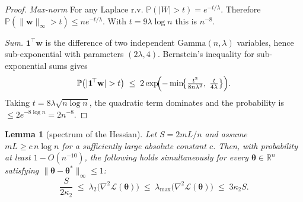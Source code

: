 \documentclass[letterpaper,12pt]{article}
\numberwithin{equation}{section}
\theoremstyle{plain}
\numberwithin{Theorem}{section}
\numberwithin{corollary}{section}
\numberwithin{proposition}{section}
\newtheorem{Lemma}{Lemma}
\numberwithin{Lemma}{section}
{
	\theoremstyle{definition}
	\newtheorem{Definition}{Definition}
	\newtheorem{example}{Example}
	\numberwithin{example}{section}
	\newtheorem{fact}{Fact}
	\numberwithin{fact}{section}
	\newtheorem{remark}{Remark}
}
\newcommand{\Pro}{\mathbb{P}}
\newcommand{\1}{\mathbbm{1}}
\def\bth{{\boldsymbol{\theta}}}
\def\R{{\mathbb R}}
\begin{document}
\begin{proof}
	\emph{Max-norm}  For any Laplace r.v.
	$\Pro(|W|>t)=e^{-t/\lambda}$.
	Therefore
	\(\Pro(\|{\mathbf w}\|_{\infty}>t)\le n e^{-t/\lambda}\).
	With $t=9\lambda\log n$ this is $n^{-8}$.
	
	\emph{Sum.}  $\mathbf1^{\!\top}\mathbf w$ is the difference of two
	independent $\mathrm{Gamma}(n,\lambda)$ variables, hence sub-exponential
	with parameters $(2\lambda,4)$.
	Bernstein's inequality for sub-exponential sums
	\cite[Lem..1]{vershynin2018high}
	gives
	\[
	\Pro\bigl(|\mathbf1^{\!\top}\mathbf w|>t\bigr)
	\;\le\;2\exp\!\Bigl(
	-\min\!\bigl\{ \tfrac{t^{2}}{8n\lambda^{2}},\;
	\tfrac{t}{4\lambda} \bigr\}
	\Bigr).
	\]
	Taking $t=8\lambda\sqrt{n\log n}$, the quadratic term dominates and
	the probability is $\le 2e^{-8\log n}=2n^{-8}$.
\end{proof}

\begin{Lemma}[spectrum of the Hessian]
	\label{lem:spectrum}
	Let $S=2mL/n$ and assume $mL\ge c\,n\log n$ for a sufficiently large
	absolute constant $c$.  Then, with probability at least
	$1-O(n^{-10})$, the following holds simultaneously for every
	$\bth\in\R^{n}$ satisfying $\|\bth-\bth^{*}\|_{\infty}\le1$:
	\[
	\frac{S}{2\kappa_{2}}
	\;\le\;
	\lambda_{2}\!\bigl(\nabla^{2}\mathcal L(\bth)\bigr)
	\;\le\;
	\lambda_{\max}\!\bigl(\nabla^{2}\mathcal L(\bth)\bigr)
	\;\le\;
	3\kappa_{2}S .
	\]
\end{Lemma}
\end{document}
